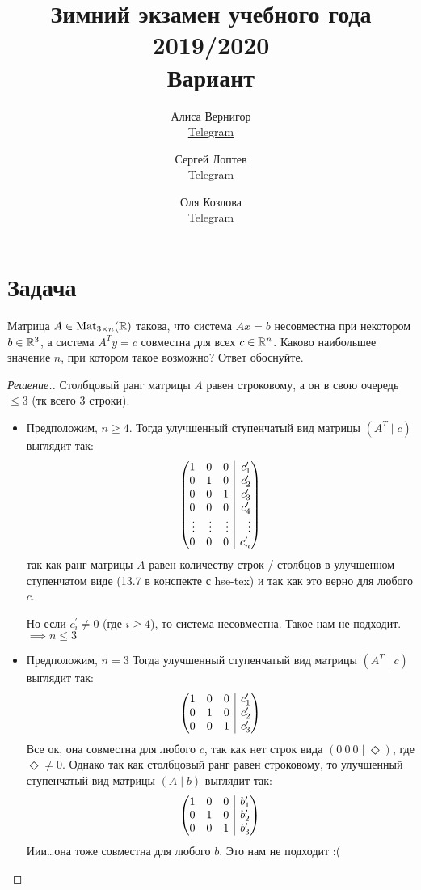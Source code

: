 \documentclass[a4paper]{article}
\title{Зимний экзамен учебного года 2019/2020\\Вариант \textnumero 1}
\author{	
    Алиса Вернигор       \\ \href{https://t.me/allisyonok}{Telegram} \and
	Сергей Лоптев        \\ \href{https://t.me/beast_sl}{Telegram} \and
	Оля Козлова        \\ \href{https://t.me/grenlayk}{Telegram}
}
\date{}
\makeatletter
\theoremstyle{remark}
\newenvironment{sysmatrix}[1]
{
    \left(\begin{array}{@{}#1@{}}
}
{\end{array}\right)}
\newcommand{\smt}[2]{\begin{sysmatrix}{#1} #2\end{sysmatrix}}
\makeatother
\begin{document}
	\maketitle

    \section*{Задача }
        Матрица $A \in \text{Mat}_{3 \times n}(\mathbb{R})$ такова, что система $Ax = b$ несовместна 
        при некотором $b \in \mathbb{R}^{3}$, а система $A^Ty = c$ совместна для всех $c \in \mathbb{R}^n$. 
        Каково наибольшее значение $n$, при котором такое возможно? Ответ обоснуйте. 
        \begin{proof}[Решение.]
            Столбцовый ранг матрицы $A$ равен строковому, а он в свою очередь $\leqslant 3$ 
            (тк всего 3 строки).

            \begin{itemize}
                \item Предположим, $n \geqslant 4$. Тогда улучшенный ступенчатый вид матрицы 
                $(A^T \mid c)$ выглядит так: 
                \[\smt{rrr|r} {
                    1 & 0 & 0 & c_1^{\prime} \\
                    0 & 1 & 0 & c_2^{\prime} \\
                    0 & 0 & 1 & c_3^{\prime} \\
                    0 & 0 & 0 & c_4^{\prime} \\
                    \vdots & \vdots & \vdots & \vdots\\
                    0 & 0 & 0 & c_n^{\prime}
                }\]
                так как ранг матрицы $A$ равен количеству строк / столбцов в улучшенном 
                ступенчатом виде (13.7 в конспекте с hse-tex) и так как это верно для любого $c$. 
                
                Но если $c_i^{\prime} \neq 0$ (где $i \geqslant 4$), то система несовместна. Такое нам не подходит. 
                $\implies n \leqslant 3$
                \item Предположим, $n = 3$ Тогда улучшенный ступенчатый вид матрицы 
                $(A^T \mid c)$ выглядит так:
                \[\smt{rrr|r} {
                    1 & 0 & 0 & c_1^{\prime} \\
                    0 & 1 & 0 & c_2^{\prime} \\
                    0 & 0 & 1 & c_3^{\prime} \\
                }\]
                Все ок, она совместна для любого $c$, так как нет строк вида $(0\ 0\ 0 \mid \Diamond)$, 
                где $\Diamond \neq 0$. Однако так как столбцовый ранг равен строковому, то 
                улучшенный ступенчатый вид матрицы 
                $(A \mid b)$ выглядит так:
                \[\smt{rrr|r} {
                    1 & 0 & 0 & b_1^{\prime} \\
                    0 & 1 & 0 & b_2^{\prime} \\
                    0 & 0 & 1 & b_3^{\prime} \\
                }\]
                Иии\dots она тоже совместна для любого $b$. Это нам не подходит :(


\end{itemize}
\end{proof}
\end{document}
